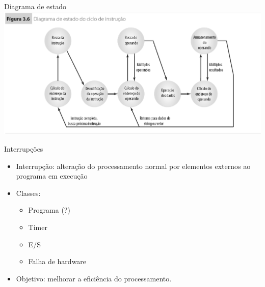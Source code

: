 \begin{slide}{Diagrama de estado}
   \centering
   \includegraphics[width=\textwidth]{figs/instrestado.eps}
\end{slide}

\begin{slide}{Interrupções}
\begin{itemize}
   \item Interrupção: alteração do processamento normal por elementos externos ao programa em execução 
   \item Classes:
   \begin{itemize}
      \item Programa (?)
      \item Timer
      \item E/S
      \item Falha de hardware
   \end{itemize}
   \item Objetivo: melhorar a eficiência do processamento.
\end{itemize}
\end{slide}


